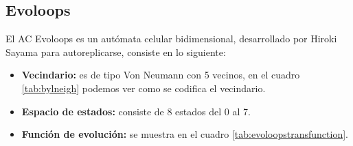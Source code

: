 \subsection{Evoloops}
El AC Evoloops \citep{Sayama1998ConstructingES} es un autómata celular bidimensional, desarrollado por Hiroki Sayama para autoreplicarse, consiste en lo siguiente:
\begin{itemize}
	\item \textbf{Vecindario:} es de tipo Von Neumann con 5 vecinos, en el cuadro \ref{tab:bylneigh} podemos ver como se codifica el vecindario.
	\item \textbf{Espacio de estados:} consiste de 8 estados del 0 al 7.
	\item \textbf{Función de evolución:} se muestra en el cuadro \ref{tab:evoloopstransfunction}.
\end{itemize}


